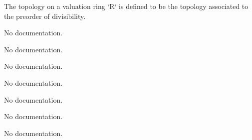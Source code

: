 \begin{definition}\label{ValuationTopology.ValuationRing.setoid}
                The topology on a valuation ring `R` is defined to be the topology associated to the preorder of divisibility.
    \end{definition}

\begin{definition}\label{ValuationTopology.ValuationRing.ValueMonoid}
                No documentation.
    \end{definition}

\begin{definition}\label{CompleteDiscreteValuationRing}
        \leanok
                No documentation.
    \end{definition}

\begin{definition}\label{CompleteValuationField}
        \leanok
                No documentation.
    \end{definition}

\begin{definition}\label{CompleteDiscreteValuationField}
        \leanok
                No documentation.
    \end{definition}

\begin{theorem}\label{lowerindex_ge_iff_lowerramificationGroup}
                No documentation.
    \end{theorem}

\begin{theorem}\label{lowerindex_eq_iff_lowerramificationGroup}
                No documentation.
    \end{theorem}

\begin{theorem}\label{lowerramificationGroup_has_top}
                No documentation.
    \end{theorem}

